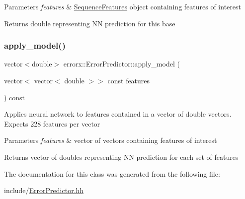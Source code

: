 \begin{DoxyParams}{Parameters}
{\em features} & \mbox{\hyperlink{classerrorx_1_1_sequence_features}{Sequence\+Features}} object containing features of interest\\
\hline
\end{DoxyParams}
\begin{DoxyReturn}{Returns}
double representing NN prediction for this base 
\end{DoxyReturn}
\mbox{\label{classerrorx_1_1_error_predictor_a9a6b40a5b46466df1a16f904b4b629bb}} 
\subsubsection{\texorpdfstring{apply\+\_\+model()}{apply\_model()}\hspace{0.1cm}{\footnotesize\ttfamily [2/2]}}
{\footnotesize\ttfamily vector$<$double$>$ errorx\+::\+Error\+Predictor\+::apply\+\_\+model (\begin{DoxyParamCaption}\item[{vector$<$ vector$<$ double $>$$>$ const}]{features }\end{DoxyParamCaption}) const}

Applies neural network to features contained in a vector of double vectors. Expects 228 features per vector


\begin{DoxyParams}{Parameters}
{\em features} & vector of vectors containing features of interest\\
\hline
\end{DoxyParams}
\begin{DoxyReturn}{Returns}
vector of doubles representing NN prediction for each set of features 
\end{DoxyReturn}


The documentation for this class was generated from the following file\+:\begin{DoxyCompactItemize}
\item 
include/\mbox{\hyperlink{_error_predictor_8hh}{Error\+Predictor.\+hh}}\end{DoxyCompactItemize}
